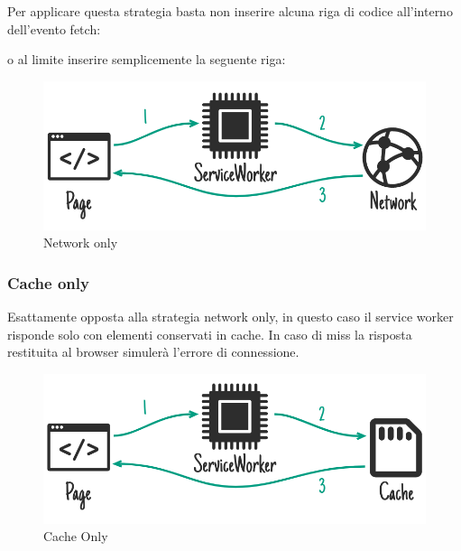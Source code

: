 \documentclass[11pt ,a4paper , twoside , openright ]{article}
\begin{document}
Per applicare  questa strategia basta non inserire alcuna riga di codice all’interno dell’evento fetch:

o al limite inserire semplicemente la seguente riga:

\begin{figure}[h]
	\centering
	\includegraphics[width=0.7\linewidth]{Strategia3}
	\caption{Network only}
	\label{fig: Network only}
\end{figure}
\pagebreak
\subsubsection{Cache only}
Esattamente opposta alla strategia network only, in questo caso il service worker risponde solo con elementi conservati in cache. In caso di miss la risposta restituita al browser simulerà l’errore di connessione.

\begin{figure}[h]
	\centering
	\includegraphics[width=0.7\linewidth]{Strategia4}
	\caption{Cache Only}
	\label{fig: Cache Only}
\end{figure}
\end{document}
